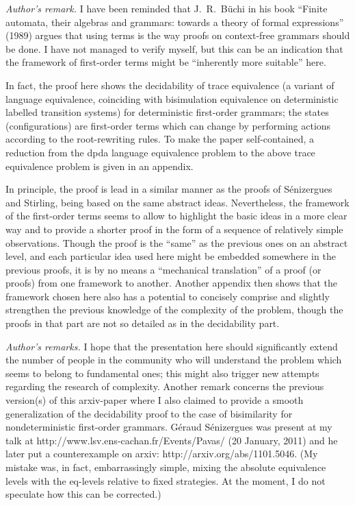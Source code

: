 \documentclass[12pt]{article}
\begin{document}
\emph{Author's remark.}
I have been reminded that J.~R.~B\"uchi in his book 
``Finite automata, their algebras and grammars: towards a theory of
formal expressions'' (1989)
argues that using terms
is the way proofs on context-free grammars should be done. 
I have not managed to verify myself, but this can be an indication that
the framework of first-order terms might be ``inherently more
suitable'' here.

In fact, the proof here shows
the decidability of trace equivalence (a variant of
language equivalence, coinciding with  bisimulation equivalence on 
deterministic labelled transition systems) for deterministic first-order
grammars; the states (configurations) are first-order terms which can
change by performing actions according to the root-rewriting rules.
To make the paper self-contained, a reduction from 
the dpda language equivalence problem to the above trace equivalence
problem is given in an appendix.

In principle, the proof is lead in a similar manner as the proofs of
S\'enizergues and Stirling, being based on the same abstract ideas.
Nevertheless, the framework of the first-order terms seems to allow to
highlight the basic ideas in a more
clear way and to provide
a shorter proof in the form of
a sequence of relatively simple observations.
Though the proof is the ``same'' as the previous ones on an abstract
level, and each particular idea used here might be embedded somewhere in the
previous proofs, it is by no means a ``mechanical translation'' of a
proof (or proofs) from one framework to another.
Another appendix then shows that the framework
chosen here also has a potential to concisely comprise
and slightly strengthen the previous
knowledge of the complexity of the problem, though the proofs in that
part are not so detailed as in the decidability part.

\emph{Author's remarks.}
I hope that the presentation here should significantly extend the number of
people in the community who will 
understand
the problem which seems to belong to fundamental ones; this might also
trigger new attempts regarding the research of complexity. 
Another remark concerns
the previous version(s) of this arxiv-paper where I also claimed to
provide a smooth generalization of the decidability proof to the case
of bisimilarity for nondeterministic first-order grammars.
G\'eraud S\'enizergues was present at my talk at 
http://www.lsv.ens-cachan.fr/Events/Pavas/ (20 January, 2011) and he
later put a counterexample on arxiv: http://arxiv.org/abs/1101.5046.
(My mistake was, in fact, embarrassingly simple, mixing the
absolute equivalence levels with the eq-levels relative to fixed
strategies. At the moment, I do not speculate how this can be
corrected.)
\end{document}
